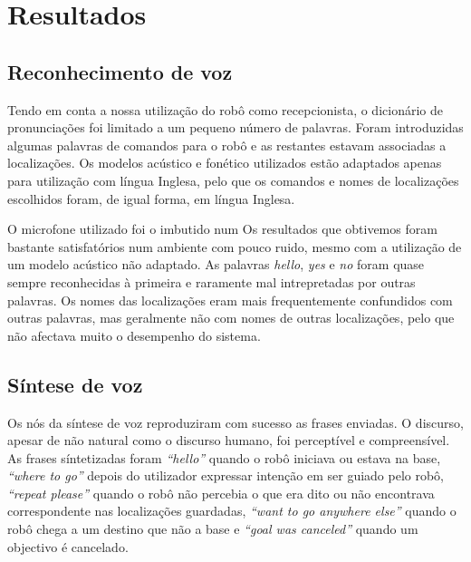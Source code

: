\documentclass[journal]{IEEEtran}
\begin{document}
\section{Resultados}


\subsection{Reconhecimento de voz}
\label{sec:resuts_recvoice}

Tendo em conta a nossa utilização do robô como recepcionista, o dicionário de pronunciações foi limitado a um pequeno número de palavras. Foram introduzidas algumas palavras de comandos para o robô e as restantes estavam associadas a localizações. Os modelos acústico e fonético utilizados estão adaptados apenas para utilização com língua Inglesa, pelo que os comandos e nomes de localizações escolhidos foram, de igual forma, em língua Inglesa.

O microfone utilizado foi o imbutido num Os resultados que obtivemos foram bastante satisfatórios num ambiente com pouco ruido, mesmo com a utilização de um modelo acústico não adaptado. As palavras \textit{hello}, \textit{yes} e \textit{no} foram quase sempre reconhecidas à primeira e raramente mal intrepretadas por outras palavras. Os nomes das localizações eram mais frequentemente confundidos com outras palavras, mas geralmente não com nomes de outras localizações, pelo que não afectava muito o desempenho do sistema.

\subsection{Síntese de voz}
\label{sec:results_sintvoice}

Os nós da síntese de voz reproduziram com sucesso as frases enviadas. O discurso, apesar de não natural como o discurso humano, foi perceptível e compreensível. As frases síntetizadas foram \textit{``hello''} quando o robô iniciava ou estava na base, \textit{``where to go''} depois do utilizador expressar intenção em ser guiado pelo robô, \textit{``repeat please''} quando o robô não percebia o que era dito ou não encontrava correspondente nas localizações guardadas, \textit{``want to go anywhere else''} quando o robô chega a um destino que não a base e \textit{``goal was canceled''} quando um objectivo é cancelado.
\end{document}
